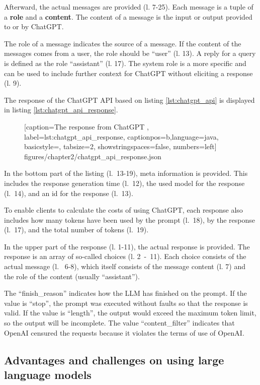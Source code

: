Afterward, the actual messages are provided (l. 7-25). Each message is a tuple of a \textbf{role} and a \textbf{content}. The content of a message is the input or output provided to or by ChatGPT. 

The role of a message indicates the source of a message. If the content of the messages comes from a user, the role should be \enquote{user} (l. 13). A reply for a query is defined as the role \enquote{assistant} (l. 17). The system role is a more specific and can be used to include further context for ChatGPT without eliciting a response (l. 9).

The response of the ChatGPT \ac{API} based on listing \ref{lst:chatgpt_api} is displayed in listing \ref{lst:chatgpt_api_response}.
 \begin{figure} [htbp!]
			
			[caption={The response from ChatGPT  \cite{ChatGPT_url}},
			label={lst:chatgpt_api_response},
			captionpos=b,language=java, basicstyle=\footnotesize, tabsize=2, showstringspaces=false,  numbers=left]
			{figures/chapter2/chatgpt_api_response.json}
		\end{figure}

In the bottom part of the listing (l.~13-19), meta information is provided. This includes the response generation time (l.~12), the used model for the response (l.~14), and an id for the response (l.~13).

To enable clients to calculate the costs of using ChatGPT, each response also includes how many tokens have been used by the prompt (l.~18), by the response (l.~17), and the total number of tokens (l.~19).

In the upper part of the response (l. 1-11), the actual response is provided. The response is an array of so-called choices (l. 2~-~11). Each choice consists of the actual message (l.~ 6-8), which itself consists of the message content (l. 7) and the role of the content (usually \enquote{assistant}).

The \enquote{finish\_reason} indicates how the \ac{LLM} has finished on the prompt. If the value is \enquote{stop}, the prompt was executed without faults so that the response is valid. If the value is \enquote{length}, the output would exceed the maximum token limit, so the output will be incomplete. The value \enquote{content\_filter} indicates that OpenAI censured the requests because it violates the terms of use of OpenAI. \cite{ChatGPT_url}


\subsection{Advantages and challenges on using large language models}\label{sec:llm_challenges}

